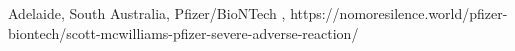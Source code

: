           {Adelaide, South Australia, }
          {}
          {Pfizer/BioNTech}
          {}
          {
            ,
          }
          {https://nomoresilence.world/pfizer-biontech/scott-mcwilliams-pfizer-severe-adverse-reaction/}


